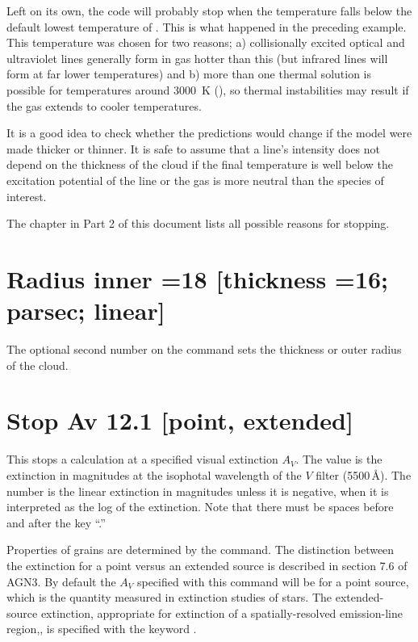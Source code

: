 Left on its own, the code will probably stop when the temperature falls
below the default lowest temperature of \TEMPSTOPDEFAULT.  This is what happened in
the preceding example.  This temperature was chosen for two reasons; a)
collisionally excited optical and ultraviolet lines generally form in gas
hotter than this (but infrared lines will form at far lower temperatures)
and b) more than one thermal solution is possible for temperatures around
3000~K (\citealp{Williams1967}), so thermal instabilities may result if the gas
extends to cooler temperatures.

It is a good idea to check whether the predictions would change if the
model were made thicker or thinner.  It is safe to assume that a line's
intensity does not depend on the thickness of the cloud if the final
temperature is well below the excitation potential of the line or the gas
is more neutral than the species of interest.

The chapter  in Part 2 of this document
lists all possible reasons for stopping.

\section{Radius inner =18 [thickness =16; parsec; linear]}

The optional
second number on the  command
sets the thickness or outer radius of the cloud.

\section{Stop Av 12.1 [point, extended]}
\label{sec:CommandStopAv}

This stops a calculation at a specified visual extinction $A_V$.
The value
is the extinction in magnitudes at the isophotal wavelength of the $V$ filter
(5500\,\AA).
The number is the linear extinction in magnitudes unless it
is negative, when it is interpreted as the log of the extinction.
Note
that there must be spaces before and after the key ``.''

Properties of grains are determined by the  command.
The distinction between the extinction for a point
versus an extended source is described in
section 7.6 of AGN3.
By default the $A_V$ specified with this command will
be for a point source,
which is the quantity measured in extinction studies
of stars.
The extended-source extinction, appropriate for extinction
of a spatially-resolved emission-line region,,
is specified with the keyword .

